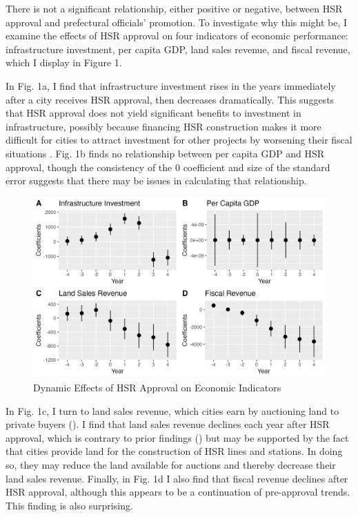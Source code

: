 \documentclass[12pt, ]{article}
\begin{document}
There is not a significant relationship, either positive or negative,
between HSR approval and prefectural officials' promotion. To
investigate why this might be, I examine the effects of HSR approval on
four indicators of economic performance: infrastructure investment, per
capita GDP, land sales revenue, and fiscal revenue, which I display in
Figure 1.

In Fig. 1a, I find that infrastructure investment rises in the years
immediately after a city receives HSR approval, then decreases
dramatically. This suggests that HSR approval does not yield significant
benefits to investment in infrastructure, possibly because financing HSR
construction makes it more difficult for cities to attract investment
for other projects by worsening their fiscal situations
\citep{ruan_high-speed_2023}. Fig. 1b finds no relationship between per
capita GDP and HSR approval, though the consistency of the 0 coefficient
and size of the standard error suggests that there may be issues in
calculating that relationship.

\begin{figure}[tbp]

{\centering \includegraphics{figures/figure1_mech.png}

}

\caption{Dynamic Effects of HSR Approval on Economic Indicators}

\end{figure}

In Fig. 1c, I turn to land sales revenue, which cities earn by
auctioning land to private buyers (\citet{lei_private_2022}). I find
that land sales revenue declines each year after HSR approval, which is
contrary to prior findings (\citet{wang_planning_2022}) but may be
supported by the fact that cities provide land for the construction of
HSR lines and stations. In doing so, they may reduce the land available
for auctions and thereby decrease their land sales revenue. Finally, in
Fig. 1d I also find that fiscal revenue declines after HSR approval,
although this appears to be a continuation of pre-approval trends. This
finding is also surprising.
\end{document}
